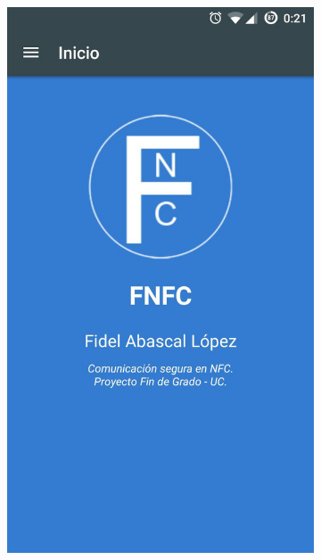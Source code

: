 \documentclass[../PFC.tex]{subfiles}
\begin{document}

\begin{figure}[H]
\centering
	\begin{subfigure}{0.4\textwidth}
		\centering
		\includegraphics[scale=0.45]{./img/pantallaPrincipal}

\end{subfigure}
\end{figure}
\end{document}

